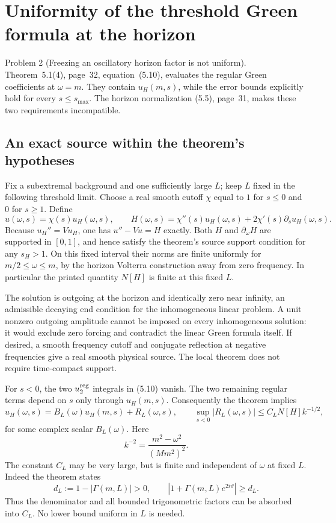 \documentclass[10pt]{article}
\begin{document}
\section*{Uniformity of the threshold Green formula at the horizon}
Problem 2 (Freezing an oscillatory horizon factor is not uniform).  Theorem 5.1(4), page 32, equation (5.10), evaluates the regular Green coefficients at \(\omega=m\). They contain \(u_H(m,s)\), while the error bounds explicitly hold for every \(s\leq s_{\max}\). The horizon normalization (5.5), page 31, makes these two requirements incompatible.\par
\subsection*{An exact source within the theorem’s hypotheses}
Fix a subextremal background and one sufficiently large \(L\); keep \(L\) fixed in the following threshold limit. Choose a real smooth cutoff \(\chi\) equal to \(1\) for \(s\leq0\) and \(0\) for \(s\geq1\). Define \[u(\omega,s)=\chi(s)u_H(\omega,s),\qquad
 H(\omega,s)=\chi''(s)u_H(\omega,s)
                 +2\chi'(s)\partial_su_H(\omega,s).\] Because \(u_H''=Vu_H\), one has \(u''-Vu=H\) exactly. Both \(H\) and \(\partial_\omega H\) are supported in \([0,1]\), and hence satisfy the theorem’s source support condition for any \(s_H>1\). On this fixed interval their norms are finite uniformly for \(m/2\leq\omega\leq m\), by the horizon Volterra construction away from zero frequency. In particular the printed quantity \(N[H]\) is finite at this fixed \(L\).\par
The solution is outgoing at the horizon and identically zero near infinity, an admissible decaying end condition for the inhomogeneous linear problem. A unit nonzero outgoing amplitude cannot be imposed on every inhomogeneous solution: it would exclude zero forcing and contradict the linear Green formula itself. If desired, a smooth frequency cutoff and conjugate reflection at negative frequencies give a real smooth physical source. The local theorem does not require time-compact support.\par
For \(s<0\), the two \(u^{\rm reg}_2\) integrals in (5.10) vanish. The two remaining regular terms depend on \(s\) only through \(u_H(m,s)\). Consequently the theorem implies \[u_H(\omega,s)=B_L(\omega)u_H(m,s)+R_L(\omega,s),
 \qquad
 \sup_{s<0}|R_L(\omega,s)|\leq C_LN[H]k^{-1/2},\] for some complex scalar \(B_L(\omega)\). Here \[k^{-2}=\frac{m^2-\omega^2}{(Mm^2)^2}.\] The constant \(C_L\) may be very large, but is finite and independent of \(\omega\) at fixed \(L\). Indeed the theorem states \[d_L:=1-|\Gamma(m,L)|>0,
 \qquad |1+\Gamma(m,L)e^{2i\vartheta}|\geq d_L.\] Thus the denominator and all bounded trigonometric factors can be absorbed into \(C_L\). No lower bound uniform in \(L\) is needed.\par
\end{document}
